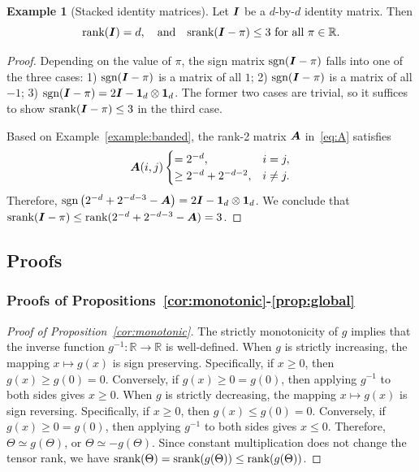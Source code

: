 \documentclass[11pt]{article}
\theoremstyle{plain}
\theoremstyle{definition}
\newtheorem{example}{Example}
\def\sign{\textup{sgn}}
\def\srank{\textup{srank}}
\def\rank{\textup{rank}}
\begin{document}
\begin{example}[Stacked identity matrices]
Let $\bm I$ be a $d$-by-$d$ identity matrix. Then
\[
\rank(\mI)=d,\quad\text{and}\quad  \srank(\mI-\pi)\leq 3 \ \text{for all }\pi\in\mathbb{R}.
\]
\end{example}
\begin{proof}
Depending on the value of $\pi$, the sign matrix $\sign(\mI-\pi)$ falls into one of the three cases: 1) $\sign(\mI-\pi)$ is a matrix of all $1$; 2) $\sign(\mI-\pi)$ is a matrix of all $-1$; 3) $\sign(\mI-\pi)=2\mI-\mathbf{1}_d\otimes \mathbf{1}_d$. The former two cases are trivial, so it suffices to show $\srank(\mI-\pi)\leq 3$ in the third case.   


Based on Example~\ref{example:banded}, the rank-2 matrix $\bm A$ in~\eqref{eq:A} satisfies 
\[
\bm A(i,j)
\begin{cases}
=2^{-d}, & i=j,\\
\geq 2^{-d}+2^{-d-2}, & i\neq j.
\end{cases}
\]
Therefore, $\sign\left(2^{-d}+2^{-d-3}-\mA\right)=2\mI-\mathbf{1}_d\otimes \mathbf{1}_d$. We conclude that $\srank(\mI-\pi)\leq \rank(2^{-d}+2^{-d-3}-\mA)=3$. 
\end{proof}

\subsection{Proofs}\label{sec:proofs}
\subsubsection{Proofs of Propositions~\ref{cor:monotonic}-\ref{prop:global}}
\begin{proof}[Proof of Proposition~\ref{cor:monotonic}]
The strictly monotonicity of $g$ implies that the inverse function $g^{-1}\colon \mathbb{R}\to \mathbb{R}$ is well-defined. 
When $g$ is strictly increasing, the mapping $x\mapsto g(x)$ is sign preserving. Specifically, if $x\geq 0$, then $g(x)\geq g(0)=0$. Conversely, if $g(x)\geq 0=g(0)$, then applying $g^{-1}$ to both sides gives $x\geq 0$.
When $g$ is strictly decreasing, the mapping $x\mapsto g(x)$ is sign reversing. Specifically, if $x\geq 0$, then $g(x)\leq g(0)=0$. Conversely, if $g(x)\geq 0=g(0)$, then applying $g^{-1}$ to both sides gives $x\leq 0$.
 Therefore, $\Theta\simeq g(\Theta)$,  or $\Theta\simeq -g(\Theta)$. Since constant multiplication  does not change the tensor rank,  we have $\srank(\Theta)=\srank(g(\Theta))\leq \rank (g(\Theta))$. 
\end{proof}
\end{document}
